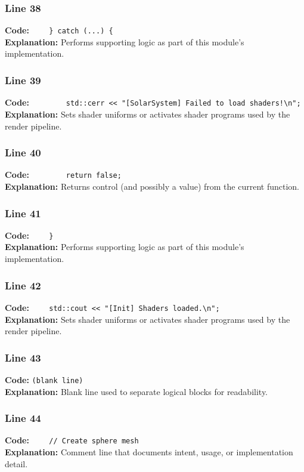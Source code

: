\documentclass[11pt,a4paper]{article}
\begin{document}
\subsubsection*{Line 38}
\textbf{Code:} \verb|    } catch (...) {|\\
\textbf{Explanation:} Performs supporting logic as part of this module's implementation.

\subsubsection*{Line 39}
\textbf{Code:} \verb|        std::cerr << "[SolarSystem] Failed to load shaders!\n";|\\
\textbf{Explanation:} Sets shader uniforms or activates shader programs used by the render pipeline.

\subsubsection*{Line 40}
\textbf{Code:} \verb|        return false;|\\
\textbf{Explanation:} Returns control (and possibly a value) from the current function.

\subsubsection*{Line 41}
\textbf{Code:} \verb|    }|\\
\textbf{Explanation:} Performs supporting logic as part of this module's implementation.

\subsubsection*{Line 42}
\textbf{Code:} \verb|    std::cout << "[Init] Shaders loaded.\n";|\\
\textbf{Explanation:} Sets shader uniforms or activates shader programs used by the render pipeline.

\subsubsection*{Line 43}
\textbf{Code:} \texttt{(blank line)}\\
\textbf{Explanation:} Blank line used to separate logical blocks for readability.

\subsubsection*{Line 44}
\textbf{Code:} \verb|    // Create sphere mesh|\\
\textbf{Explanation:} Comment line that documents intent, usage, or implementation detail.
\end{document}
